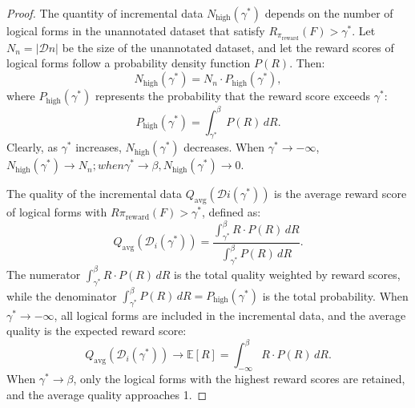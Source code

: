\documentclass{article}
\theoremstyle{plain}
\theoremstyle{definition}
\theoremstyle{remark}
\begin{document}
\begin{proof}
The quantity of incremental data $N_{\text{high}}(\gamma^*)$ depends on the number of logical forms in the unannotated dataset that satisfy $R_{\pi_{\text{reward}}}(F) > \gamma^*$. Let $N_n = |\mathcal{D}n|$ be the size of the unannotated dataset, and let the reward scores of logical forms follow a probability density function $P(R)$. Then:
\begin{equation}
N_{\text{high}}(\gamma^*) = N_n \cdot P_{\text{high}}(\gamma^*),
\end{equation}
where $P_{\text{high}}(\gamma^*)$ represents the probability that the reward score exceeds $\gamma^*$:
\begin{equation}
P_{\text{high}}(\gamma^*) = \int_{\gamma^*}^{\beta} P(R) \, dR.
\end{equation}
Clearly, as $\gamma^*$ increases, $N_{\text{high}}(\gamma^*)$ decreases. When $\gamma^* \to -\infty$, $N_{\text{high}}(\gamma^*) \to N_n; when \gamma^* \to \beta, N_{\text{high}}(\gamma^*) \to 0$.

The quality of the incremental data $Q_{\text{avg}}(\mathcal{D}i(\gamma^*))$ is the average reward score of logical forms with $R{\pi_{\text{reward}}}(F) > \gamma^*$, defined as:
\begin{equation}
Q_{\text{avg}}(\mathcal{D}_i(\gamma^*)) = \frac{\int_{\gamma^*}^{\beta} R \cdot P(R) \, dR}{\int_{\gamma^*}^{\beta} P(R) \, dR}.
\end{equation}
The numerator $\int_{\gamma^*}^{\beta} R \cdot P(R) \, dR$ is the total quality weighted by reward scores, while the denominator $\int_{\gamma^*}^{\beta} P(R) \, dR = P_{\text{high}}(\gamma^*)$ is the total probability.
When $\gamma^* \to -\infty$, all logical forms are included in the incremental data, and the average quality is the expected reward score:
\begin{equation}
Q_{\text{avg}}(\mathcal{D}_i(\gamma^*)) \to \mathbb{E}[R] = \int_{-\infty}^{\beta} R \cdot P(R) \, dR.
\end{equation}
When $\gamma^* \to \beta$, only the logical forms with the highest reward scores are retained, and the average quality approaches 1.


\end{proof}
\end{document}
